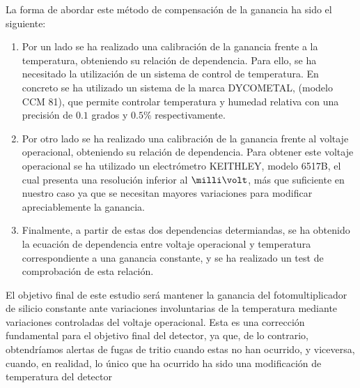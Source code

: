 La forma de abordar este método de compensación de la ganancia ha sido el siguiente:
\begin{enumerate}
\item {} 
Por un lado se ha realizado una calibración de la ganancia frente a la temperatura, obteniendo su relación de dependencia. Para ello, se ha necesitado la utilización de un sistema de control de temperatura. En concreto se ha utilizado un sistema de la marca DYCOMETAL, (modelo CCM 81), que permite controlar temperatura y humedad relativa con una precisión de $0.1$ grados  y  $0.5$\% respectivamente.

\item {} Por otro lado se ha realizado una calibración de la ganancia frente al voltaje operacional, obteniendo su relación de dependencia. Para obtener este voltaje operacional se ha utilizado un electrómetro KEITHLEY, modelo 6517B, el cual presenta una resolución inferior al $\milli\volt$, más que suficiente en nuestro caso ya que se necesitan mayores variaciones para modificar apreciablemente  la ganancia.

\item {} Finalmente, a partir de estas dos dependencias determiandas, se ha obtenido la ecuación de dependencia entre voltaje operacional y temperatura correspondiente a una ganancia constante,  y se ha realizado un test de comprobación de esta relación.
\end{enumerate}

El objetivo final de este estudio será mantener la ganancia del fotomultiplicador de silicio constante ante variaciones involuntarias de la temperatura mediante variaciones controladas del voltaje operacional. Esta es una corrección fundamental para el objetivo final del detector, ya que, de lo contrario, obtendríamos alertas de fugas de tritio cuando estas no han ocurrido, y viceversa,  cuando, en realidad, lo único que ha ocurrido ha sido una modificación de temperatura del detector